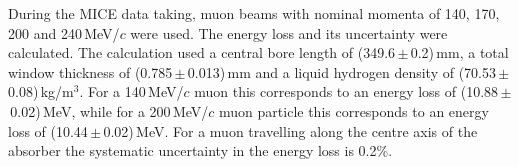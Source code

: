 During the MICE data taking, muon beams with nominal momenta of 140,
170, 200 and 240\,MeV/$c$ were used.
The energy loss and its uncertainty were calculated.
The calculation used a central bore length of
(349.6\,$\mathrm{\pm}$\,0.2)\,mm, a total window thickness of
(0.785\,$\mathrm{\pm}$\,0.013)\,mm and a liquid hydrogen density of
(70.53\,$\mathrm{\pm}$\,0.08)\,kg/m$^{3}$.
For a 140\,MeV/$c$ muon this corresponds to an energy loss of
(10.88\,$\mathrm{\pm}$\,0.02)\,MeV, while for a 200\,MeV/$c$ muon 
particle this corresponds to an energy loss of
(10.44\,$\mathrm{\pm}$\,0.02)\,MeV.
For a muon travelling along the centre axis of the absorber the
systematic uncertainty in the energy loss is 0.2\%.
